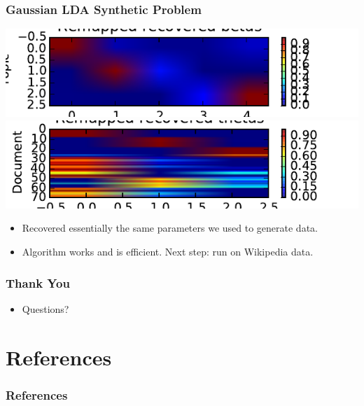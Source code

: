 \documentclass{beamer}
\begin{document}
\begin{frame}
  \frametitle{Gaussian LDA Synthetic Problem}
  \begin{center}
    \includegraphics[height=0.2\textheight]{assets/remapped_recovered_betas.pdf}\\
    \includegraphics[height=0.2\textheight]{assets/remapped_recovered_thetas.pdf}
  \end{center}
  \begin{itemize}
    \item Recovered essentially the same parameters we used to generate data.
    \item Algorithm works and is efficient. Next step: run on Wikipedia data.
  \end{itemize}
\end{frame}

\begin{frame}
  \frametitle{Thank You}
  \begin{itemize}
  \item Questions?
  \end{itemize}
\end{frame}

\section{References}
\begin{frame}[t,allowframebreaks]{}
\frametitle{References}
{\small
\printbibliography
\par}
\end{frame}
\end{document}
